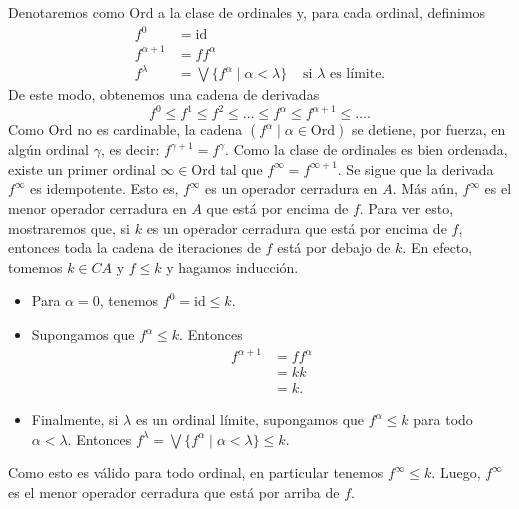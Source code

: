 \documentclass[12pt,letterpaper,titlepage]{article}
\theoremstyle{definition}
\newcommand\Sup{\bigvee}
\newcommand\<{\langle}
\renewcommand\>{\rangle}
\newcommand{\Ord}{\mathrm{Ord}}
\newcommand{\id}{\mathrm{id}}
\begin{document}
Denotaremos como $\Ord$ a la clase de ordinales y, para cada
ordinal, definimos
\begin{align*}
  f^0 &= \id \\
  f^{\alpha+1} &= ff^\alpha \\
  f^\lambda &= \Sup\{f^\alpha \mid \alpha<\lambda\}
    & \text{ si $\lambda$ es límite.}
\end{align*}
De este modo, obtenemos una cadena de derivadas
\[
  f^0\leq f^1\leq f^2\leq\dots\leq f^\alpha\leq f^{\alpha+1}
  \leq\dots
.\]
Como $\Ord$ no es cardinable, la cadena
$(f^\alpha \mid \alpha\in \Ord )$ se detiene, por fuerza, en
algún ordinal $\gamma$, es decir: $f^{\gamma+1}=f^\gamma$.
Como la clase de ordinales es bien ordenada, existe un primer
ordinal $\infty\in\Ord$ tal que $f^\infty=f^{\infty+1}$.
Se sigue que la derivada $f^\infty$ es idempotente.
Esto es, $f^\infty$ es un operador cerradura en $A$.
Más aún, $f^\infty$ es el menor operador cerradura en $A$
que está por encima de $f$.
Para ver esto, mostraremos que, si $k$ es un operador cerradura
que está por encima de $f$, entonces toda la cadena de iteraciones
de $f$ está por debajo de $k$.
En efecto, tomemos $k\in CA$ y $f\leq k$ y hagamos inducción.
\begin{itemize}
  \item Para $\alpha=0$, tenemos $f^0=\id\leq k$.
  \item Supongamos que $f^\alpha\leq k$.
  Entonces
  \begin{align*}
    f^{\alpha+1}
    &= ff^\alpha \\
    &= kk \\
    &= k.
  \end{align*}
  \item Finalmente, si $\lambda$ es un ordinal límite, supongamos
  que $f^\alpha\leq k$ para todo $\alpha<\lambda$.
  Entonces
  $f^\lambda=\Sup\{f^\alpha\mid \alpha<\lambda\}\leq k$.
\end{itemize}
Como esto es válido para todo ordinal, en particular tenemos
$f^\infty\leq k$.
Luego, $f^\infty$ es el menor operador cerradura que está por
arriba de $f$.
\end{document}
